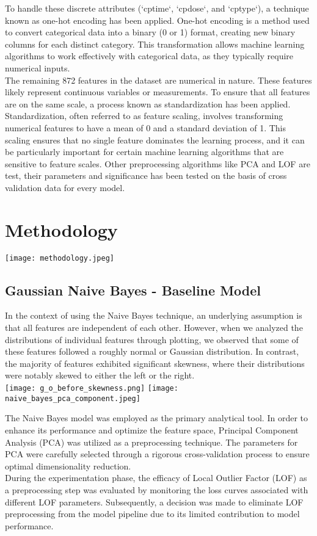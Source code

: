\documentclass{article}
\begin{document}
\begin{multicols}{2}
To handle these discrete attributes (`cptime`, `cpdose`, and `cptype`), a technique known as one-hot encoding has been applied. One-hot encoding is a method used to convert categorical data into a binary (0 or 1) format, creating new binary columns for each distinct category. This transformation allows machine learning algorithms to work effectively with categorical data, as they typically require numerical inputs.\\

The remaining 872 features in the dataset are numerical in nature. These features likely represent continuous variables or measurements. To ensure that all features are on the same scale, a process known as standardization has been applied. Standardization, often referred to as feature scaling, involves transforming numerical features to have a mean of 0 and a standard deviation of 1. This scaling ensures that no single feature dominates the learning process, and it can be particularly important for certain machine learning algorithms that are sensitive to feature scales. Other preprocessing algorithms like PCA and LOF are test, their parameters and significance has been tested on the basis of cross validation data for every model.

\section{Methodology}
\texttt{[image: methodology.jpeg]}
\subsection{Gaussian Naive Bayes - Baseline Model}
In the context of using the Naive Bayes technique, an underlying assumption is that all features are independent of each other. However, when we analyzed the distributions of individual features through plotting, we observed that some of these features followed a roughly normal or Gaussian distribution. In contrast, the majority of features exhibited significant skewness, where their distributions were notably skewed to either the left or the right.\\
\texttt{[image: g\_o\_before\_skewness.png]}
\texttt{[image: naive\_bayes\_pca\_component.jpeg]}

The Naive Bayes model was employed as the primary analytical tool. In order to enhance its performance and optimize the feature space, Principal Component Analysis (PCA) was utilized as a preprocessing technique. The parameters for PCA were carefully selected through a rigorous cross-validation process to ensure optimal dimensionality reduction.\\
During the experimentation phase, the efficacy of Local Outlier Factor (LOF) as a preprocessing step was evaluated by monitoring the loss curves associated with different LOF parameters. Subsequently, a decision was made to eliminate LOF preprocessing from the model pipeline due to its limited contribution to model performance.


\end{multicols}
\end{document}
